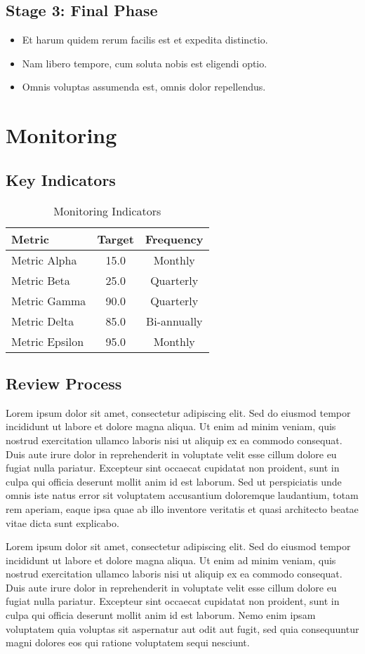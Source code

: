 \documentclass[11pt,a4paper]{article}
\newcommand{\loremtext}[1]{%
  Lorem ipsum dolor sit amet, consectetur adipiscing elit. Sed do eiusmod tempor incididunt ut labore et dolore magna aliqua. Ut enim ad minim veniam, quis nostrud exercitation ullamco laboris nisi ut aliquip ex ea commodo consequat. Duis aute irure dolor in reprehenderit in voluptate velit esse cillum dolore eu fugiat nulla pariatur. Excepteur sint occaecat cupidatat non proident, sunt in culpa qui officia deserunt mollit anim id est laborum.%
}
\begin{document}
\subsection{Stage 3: Final Phase}

\begin{itemize}
  \item Et harum quidem rerum facilis est et expedita distinctio.
  \item Nam libero tempore, cum soluta nobis est eligendi optio.
  \item Omnis voluptas assumenda est, omnis dolor repellendus.
\end{itemize}

\section{Monitoring}

\subsection{Key Indicators}

\begin{table}[h]
\centering
\begin{tabular}{|l|c|c|}
\hline
\textbf{Metric} & \textbf{Target} & \textbf{Frequency} \\
\hline
Metric Alpha & 15.0 & Monthly \\
\hline
Metric Beta & 25.0 & Quarterly \\
\hline
Metric Gamma & 90.0 & Quarterly \\
\hline
Metric Delta & 85.0 & Bi-annually \\
\hline
Metric Epsilon & 95.0 & Monthly \\
\hline
\end{tabular}
\caption{Monitoring Indicators}
\end{table}

\subsection{Review Process}

\loremtext{16} Sed ut perspiciatis unde omnis iste natus error sit voluptatem accusantium doloremque laudantium, totam rem aperiam, eaque ipsa quae ab illo inventore veritatis et quasi architecto beatae vitae dicta sunt explicabo.

\loremtext{17} Nemo enim ipsam voluptatem quia voluptas sit aspernatur aut odit aut fugit, sed quia consequuntur magni dolores eos qui ratione voluptatem sequi nesciunt.
\end{document}
